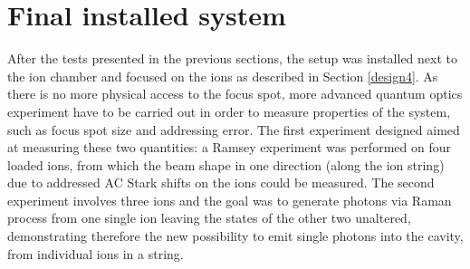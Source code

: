 \newpage
\section{Final installed system}
\label{sec:finalsetup}
After the tests presented in the previous sections, the setup was installed next to the ion chamber and focused on the ions as described in Section \ref{design4}. As there is no more physical access to the focus spot, more advanced quantum optics experiment have to be carried out in order to measure properties of the system, such as focus spot size and addressing error. The first experiment designed aimed at measuring these two quantities: a Ramsey experiment was performed on four loaded ions, from which the beam shape in one direction (along the ion string) due to addressed AC Stark shifts on the ions could be measured.
The second experiment involves three ions and the goal was to generate photons via Raman process from one single ion leaving the states of the other two unaltered, demonstrating therefore the new possibility to emit single photons into the cavity, from individual ions in a string.

